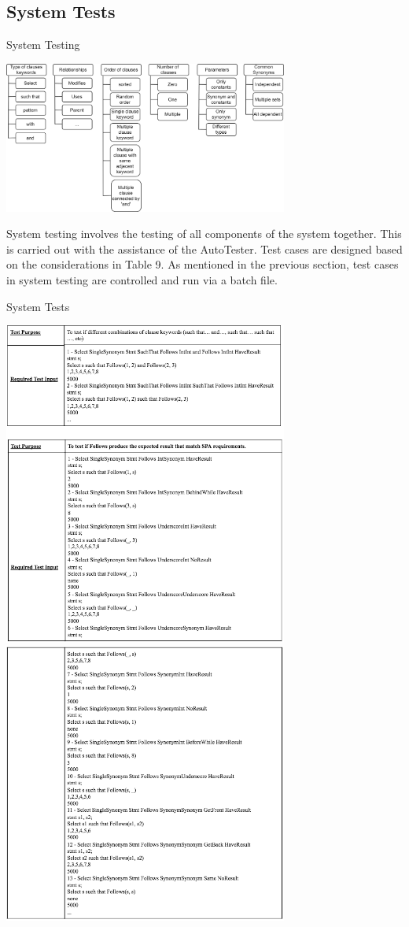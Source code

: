 \documentclass[12pt]{article}
\begin{document}
{{{{{{{{{{\subsection{System Tests}
\begin{table}[!htbp]
  \centering 
  \caption{System Testing}
 \includegraphics[width=0.7\textwidth]{SystemTesting1.png}
\end{table}
System testing involves the testing of all components of the system together. This is carried out with the assistance of the AutoTester. Test cases are designed based on the considerations in Table 9.
As mentioned in the previous section, test cases in system testing are controlled and run via a batch file.
\begin{table}[!htbp]
  \centering 
  \caption{System Tests}
 \includegraphics[width=0.7\textwidth]{SystemTest2.png}
 \includegraphics[width=0.7\textwidth]{SystemTest3.png}
\end{table}
}}}}}}}}}}
\end{document}
